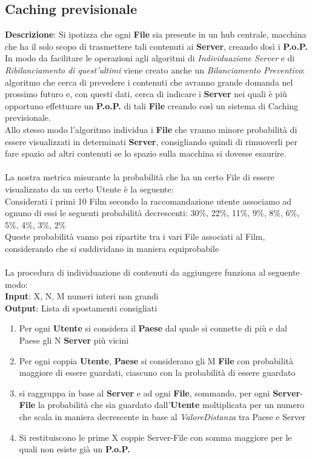 \documentclass{article}
\begin{document}
\subsection{Caching previsionale}
\textbf{Descrizione}: Si ipotizza che ogni \textbf{File} sia presente in un hub centrale, macchina che ha il solo scopo di trasmettere tali contenuti ai \textbf{ Server}, creando dosì i \textbf{P.o.P.} \\
In modo da facilitare le operazioni agli algoritmi di \textit{Individuazione Server} e di \textit{Ribilanciamento di quest'ultimi} viene creato anche un \textit{Bilanciamento Preventivo}: algoritmo che cerca di prevedere i contenuti che avranno grande domanda nel prossimo futuro e, con questi dati, cerca di indicare i \textbf{Server} nei quali è più opportuno effettuare un \textbf{P.o.P.} di tali \textbf{File} creando così un sistema di Caching previsionale. \\ Allo stesso modo l'algoritmo individua i \textbf{File} che vranno minore probabilità di essere visualizzati in determinati \textbf{Server}, consigliando quindi di rimuoverli per fare spazio ad altri contenuti se lo spazio sulla macchina si dovesse esaurire. \\ \\
La nostra metrica misurante la probabilità che ha un certo File di essere visualizzato da un certo Utente è la seguente: \\ Considerati i primi 10 Film secondo la raccomandazione utente associamo ad ognuno di essi le seguenti probabilità decrescenti: 30\%, 22\%, 11\%, 9\%, 8\%, 6\%, 5\%, 4\%, 3\%, 2\% \\ 
Queste probabilità vanno poi ripartite tra i vari File associati al Film, considerando che si suddividano in maniera equiprobabile \\ \\
La procedura di individuazione di contenuti da aggiungere funziona al seguente modo: \\
\textbf{Input}: X, N, M numeri interi non grandi \\
\textbf{Output}: Lista di spostamenti consigliati \\
\begin{enumerate}
    \item Per ogni \textbf{Utente} si considera il \textbf{Paese} dal quale si connette di più e dal Paese gli N \textbf{Server} più vicini
    
    \item Per ogni coppia \textbf{Utente}, \textbf{Paese} si considerano gli M \textbf{File} con probabilità maggiore di essere guardati, ciascuno con la probabilità di essere guardato
    
    \item si raggruppa in base al \textbf{Server} e ad ogni \textbf{File}, sommando, per ogni \textbf{Server}-\textbf{File} la probabilità che sia guardato dall'\textbf{Utente} moltiplicata per un numero che scala in maniera decrescente in base al \textit{ValoreDistanza} tra Paese e Server

    \item Si restituiscono le prime X coppie Server-File con somma maggiore per le quali non esiste già un \textbf{P.o.P.}
\end{enumerate}
\end{document}
